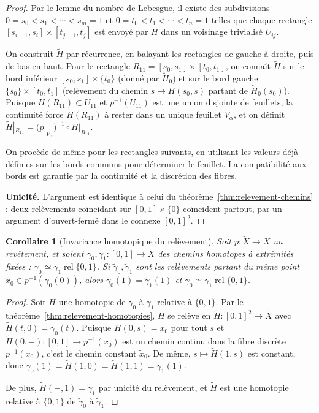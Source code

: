 \documentclass[12pt,a4paper,openany]{book}
\theoremstyle{definition}
\theoremstyle{plain}
\newtheorem{corollaire}[definition]{Corollaire}
\theoremstyle{remark}
\newcommand{\rel}{\operatorname{rel}}
\begin{document}
\begin{proof}
Par le lemme du nombre de Lebesgue, il existe des subdivisions
$0 = s_0 < s_1 < \cdots < s_m = 1$ et $0 = t_0 < t_1 < \cdots < t_n = 1$ telles que
chaque rectangle $[s_{i-1}, s_i] \times [t_{j-1}, t_j]$ est envoyé par $H$ dans un voisinage
trivialisé $U_{ij}$.

On construit $\widetilde{H}$ par récurrence, en balayant les rectangles de gauche à droite,
puis de bas en haut. Pour le rectangle $R_{11} = [s_0, s_1] \times [t_0, t_1]$, on connaît
$\widetilde{H}$ sur le bord inférieur $[s_0, s_1] \times \{t_0\}$ (donné par $\tilde{H}_0$)
et sur le bord gauche $\{s_0\} \times [t_0, t_1]$ (relèvement du chemin $s \mapsto H(s_0, s)$
partant de $\tilde{H}_0(s_0)$). Puisque $H(R_{11}) \subset U_{11}$ et $p^{-1}(U_{11})$
est une union disjointe de feuillets, la continuité force $\widetilde{H}(R_{11})$ à rester
dans un unique feuillet $V_\alpha$, et on définit
$\widetilde{H}|_{R_{11}} = (p|_{V_\alpha})^{-1} \circ H|_{R_{11}}$.

On procède de même pour les rectangles suivants, en utilisant les valeurs déjà définies
sur les bords communs pour déterminer le feuillet. La compatibilité aux bords est garantie
par la continuité et la discrétion des fibres.

\textbf{Unicité.} L'argument est identique à celui du théorème~\ref{thm:relevement-chemins} :
deux relèvements coïncidant sur $[0,1] \times \{0\}$ coïncident partout, par un argument
d'ouvert-fermé dans le connexe $[0,1]^2$.
\end{proof}

\begin{corollaire}[Invariance homotopique du relèvement]\label{cor:invariance-relevement}
Soit $p \colon \widetilde{X} \to X$ un revêtement, et soient $\gamma_0, \gamma_1 \colon [0,1]
\to X$ des chemins homotopes à extrémités fixées : $\gamma_0 \simeq \gamma_1 \rel \{0,1\}$.
Si $\tilde{\gamma}_0, \tilde{\gamma}_1$ sont les relèvements partant du même point
$\tilde{x}_0 \in p^{-1}(\gamma_0(0))$, alors
$\tilde{\gamma}_0(1) = \tilde{\gamma}_1(1)$ et
$\tilde{\gamma}_0 \simeq \tilde{\gamma}_1 \rel \{0,1\}$.
\end{corollaire}

\begin{proof}
Soit $H$ une homotopie de $\gamma_0$ à $\gamma_1$ relative à $\{0,1\}$.
Par le théorème~\ref{thm:relevement-homotopies}, $H$ se relève en
$\widetilde{H} \colon [0,1]^2 \to \widetilde{X}$ avec $\widetilde{H}(t, 0) = \tilde{\gamma}_0(t)$.
Puisque $H(0, s) = x_0$ pour tout $s$ et $\widetilde{H}(0, -) \colon [0,1] \to p^{-1}(x_0)$
est un chemin continu dans la fibre discrète $p^{-1}(x_0)$, c'est le chemin constant $\tilde{x}_0$.
De même, $s \mapsto \widetilde{H}(1, s)$ est constant, donc $\tilde{\gamma}_0(1) = \widetilde{H}(1, 0)
= \widetilde{H}(1, 1) = \tilde{\gamma}_1(1)$.

De plus, $\widetilde{H}(-, 1) = \tilde{\gamma}_1$ par unicité du relèvement, et $\widetilde{H}$
est une homotopie relative à $\{0,1\}$ de $\tilde{\gamma}_0$ à $\tilde{\gamma}_1$.
\end{proof}
\end{document}
